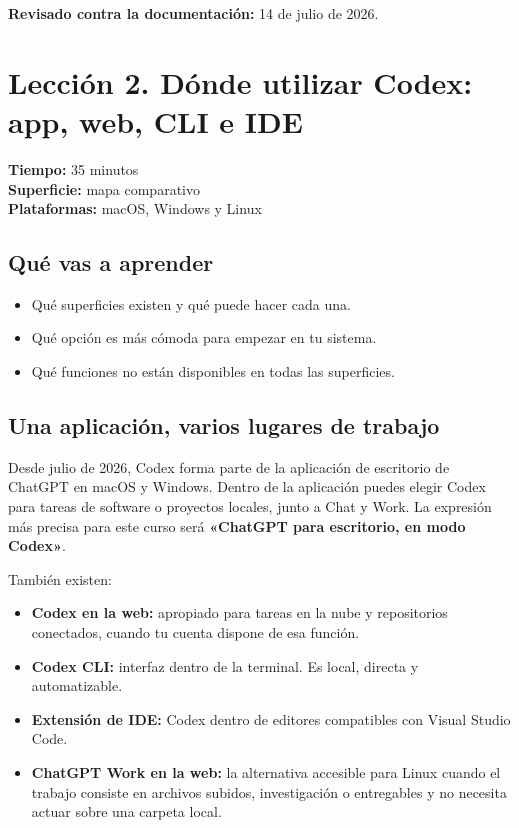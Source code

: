 \documentclass[10pt,a4paper,openany]{book}
\providecommand{\tightlist}{\setlength{\itemsep}{0.18em}\setlength{\parskip}{0pt}}
\begin{document}
\textbf{Revisado contra la documentación:} 14 de julio de 2026.

\clearpage

\section{Lección 2. Dónde utilizar Codex: app, web, CLI e
IDE}\label{lecciuxf3n-2.-duxf3nde-utilizar-codex-app-web-cli-e-ide}

\begin{metabox}

\textbf{Tiempo:} 35 minutos\\
\textbf{Superficie:} mapa comparativo\\
\textbf{Plataformas:} macOS, Windows y Linux

\end{metabox}

\subsection{Qué vas a aprender}\label{quuxe9-vas-a-aprender-1}

\begin{itemize}
\tightlist
\item
  Qué superficies existen y qué puede hacer cada una.
\item
  Qué opción es más cómoda para empezar en tu sistema.
\item
  Qué funciones no están disponibles en todas las superficies.
\end{itemize}

\subsection{Una aplicación, varios lugares de
trabajo}\label{una-aplicaciuxf3n-varios-lugares-de-trabajo}

Desde julio de 2026, Codex forma parte de la aplicación de escritorio de
ChatGPT en macOS y Windows. Dentro de la aplicación puedes elegir Codex
para tareas de software o proyectos locales, junto a Chat y Work. La
expresión más precisa para este curso será \textbf{«ChatGPT para
escritorio, en modo Codex»}.

También existen:

\begin{itemize}
\tightlist
\item
  \textbf{Codex en la web:} apropiado para tareas en la nube y
  repositorios conectados, cuando tu cuenta dispone de esa función.
\item
  \textbf{Codex CLI:} interfaz dentro de la terminal. Es local, directa
  y automatizable.
\item
  \textbf{Extensión de IDE:} Codex dentro de editores compatibles con
  Visual Studio Code.
\item
  \textbf{ChatGPT Work en la web:} la alternativa accesible para Linux
  cuando el trabajo consiste en archivos subidos, investigación o
  entregables y no necesita actuar sobre una carpeta local.
\end{itemize}
\end{document}
